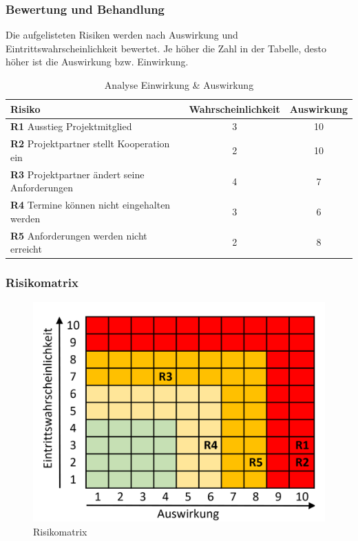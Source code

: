 \subsubsection{Bewertung und Behandlung}
Die aufgelisteten Risiken werden nach Auswirkung und Eintrittswahrscheinlichkeit bewertet.
Je höher die Zahl in der Tabelle, desto höher ist die Auswirkung bzw. Einwirkung.
\begin{table}[h]
	\begin{tabular}{l|c|c}
		\textbf{Risiko}                           & \multicolumn{1}{l|}{\textbf{Wahrscheinlichkeit}} & \multicolumn{1}{l}{\textbf{Auswirkung}} \\ \hline
		\textbf{R1} Ausstieg Projektmitglied                  & 3                                                & 10                                      \\
		\textbf{R2} Projektpartner stellt Kooperation ein     & 2                                                & 10                                      \\
		\textbf{R3} Projektpartner ändert seine Anforderungen & 4                                                & 7                                       \\
		\textbf{R4} Termine können nicht eingehalten werden   & 3                                                & 6                                       \\
		\textbf{R5} Anforderungen werden nicht erreicht       & 2                                                & 8                                      
	\end{tabular}
	\caption{Analyse Einwirkung \& Auswirkung}
	\label{Abb_Einwirkung_Auswirkung}
\end{table}
\newpage

\subsubsection{Risikomatrix}
\begin{figure}[h]
	\centering
	\includegraphics[scale=0.6]{figures/matrix.png}
	\caption{Risikomatrix}
	\label{Abb_Risikomatrix}
\end{figure}



